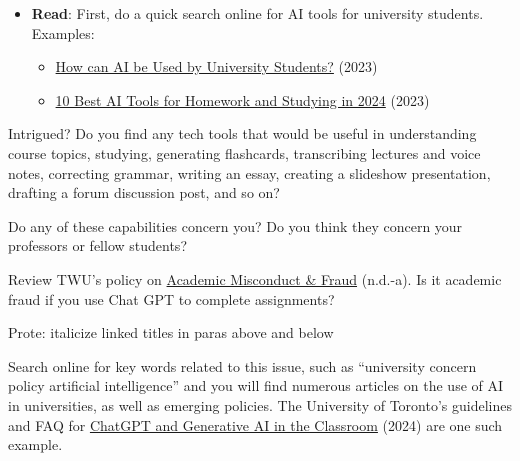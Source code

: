 \documentclass[
  letterpaper,
  DIV=11,
  numbers=noendperiod]{scrreprt}
\providecommand{\tightlist}{%
  \setlength{\itemsep}{0pt}\setlength{\parskip}{0pt}}\usepackage{longtable,booktabs,array}
\begin{document}
\begin{tcolorbox}[enhanced jigsaw, toprule=.15mm, colback=white, colframe=quarto-callout-note-color-frame, bottomtitle=1mm, leftrule=.75mm, coltitle=black, titlerule=0mm, rightrule=.15mm, colbacktitle=quarto-callout-note-color!10!white, left=2mm, title={Learning Activity}, opacitybacktitle=0.6, opacityback=0, breakable, toptitle=1mm, arc=.35mm, bottomrule=.15mm]

\begin{itemize}
\tightlist
\item
  \textbf{Read}: First, do a quick search online for AI tools for
  university students. Examples:

  \begin{itemize}
  \tightlist
  \item
    \href{https://www.timeshighereducation.com/student/advice/how-can-ai-be-used-university-students}{How
    can AI be Used by University Students?} (2023)
  \item
    \href{https://mystudylife.com/10-best-ai-tools-to-help-students-learn-faster/}{10
    Best AI Tools for Homework and Studying in 2024} (2023)
  \end{itemize}
\end{itemize}

Intrigued? Do you find any tech tools that would be useful in
understanding course topics, studying, generating flashcards,
transcribing lectures and voice notes, correcting grammar, writing an
essay, creating a slideshow presentation, drafting a forum discussion
post, and so on?

Do any of these capabilities concern you? Do you think they concern your
professors or fellow students?

Review TWU's policy on
\href{https://www.twu.ca/about-us/policies-guidelines/university-policies/academic-misconduct-fraud}{Academic
Misconduct \& Fraud} (n.d.-a). Is it academic fraud if you use Chat GPT
to complete assignments?

Prote: italicize linked titles in paras above and below

Search online for key words related to this issue, such as ``university
concern policy artificial intelligence'' and you will find numerous
articles on the use of AI in universities, as well as emerging policies.
The University of Toronto's guidelines and FAQ for
\href{https://www.viceprovostundergrad.utoronto.ca/strategic-priorities/digital-learning/special-initiative-artificial-intelligence/}{ChatGPT
and Generative AI in the Classroom} (2024) are one such example.


\end{tcolorbox}
\end{document}
